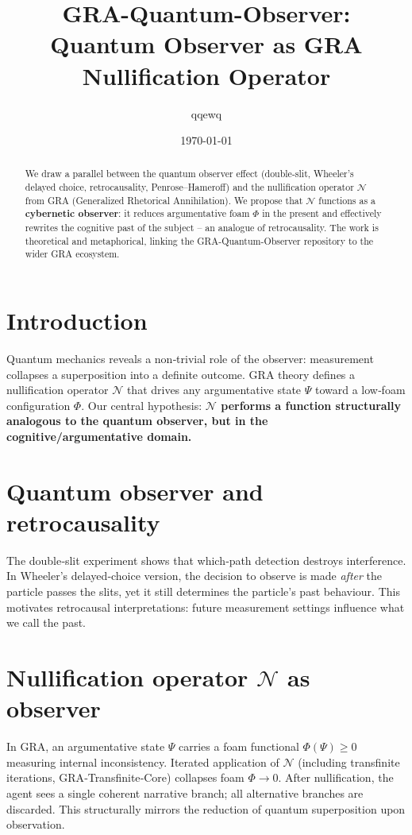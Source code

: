 \documentclass[a4paper,12pt]{article}
\title{GRA-Quantum-Observer: Quantum Observer as GRA Nullification Operator}
\author{qqewq}
\date{\today}
\begin{document}
\maketitle

\begin{abstract}
We draw a parallel between the quantum observer effect (double-slit, Wheeler's delayed choice, retrocausality, Penrose–Hameroff) and the nullification operator $\mathcal{N}$ from GRA (Generalized Rhetorical Annihilation). We propose that $\mathcal{N}$ functions as a \textbf{cybernetic observer}: it reduces argumentative foam $\Phi$ in the present and effectively rewrites the cognitive past of the subject – an analogue of retrocausality. The work is theoretical and metaphorical, linking the GRA-Quantum-Observer repository to the wider GRA ecosystem.
\end{abstract}

\section{Introduction}
Quantum mechanics reveals a non‑trivial role of the observer: measurement collapses a superposition into a definite outcome. GRA theory defines a nullification operator $\mathcal{N}$ that drives any argumentative state $\Psi$ toward a low‑foam configuration $\Phi$. Our central hypothesis: \textbf{$\mathcal{N}$ performs a function structurally analogous to the quantum observer, but in the cognitive/argumentative domain.}

\section{Quantum observer and retrocausality}
The double‑slit experiment shows that which‑path detection destroys interference. In Wheeler’s delayed‑choice version, the decision to observe is made \emph{after} the particle passes the slits, yet it still determines the particle’s past behaviour. This motivates retrocausal interpretations: future measurement settings influence what we call the past.

\section{Nullification operator $\mathcal{N}$ as observer}
In GRA, an argumentative state $\Psi$ carries a foam functional $\Phi(\Psi) \ge 0$ measuring internal inconsistency. Iterated application of $\mathcal{N}$ (including transfinite iterations, GRA‑Transfinite‑Core) collapses foam $\Phi \to 0$. After nullification, the agent sees a single coherent narrative branch; all alternative branches are discarded. This structurally mirrors the reduction of quantum superposition upon observation.
\end{document}
